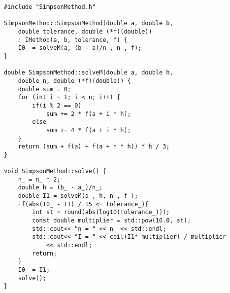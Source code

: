 \begin{lstlisting}
#include "SimpsonMethod.h"

SimpsonMethod::SimpsonMethod(double a, double b,
    double tolerance, double (*f)(double)) 
    : IMethod(a, b, tolerance, f) {
    I0_ = solveM(a, (b - a)/n_, n_, f);
}

double SimpsonMethod::solveM(double a, double h,
    double n, double (*f)(double)) {
    double sum = 0;
    for (int i = 1; i < n; i++) {
        if(i % 2 == 0)
            sum += 2 * f(a + i * h);
        else
            sum += 4 * f(a + i * h);
    }
    return (sum + f(a) + f(a + n * h)) * h / 3;
}

void SimpsonMethod::solve() {
    n_ = n_ * 2;
    double h = (b_ - a_)/n_;
    double I1 = solveM(a_, h, n_, f_);
    if(abs(I0_ - I1) / 15 <= tolerance_){
        int st = round(abs(log10(tolerance_)));
        const double multiplier = std::pow(10.0, st);
        std::cout<< "n = " << n_ << std::endl;
        std::cout<< "I = " << ceil(I1* multiplier) / multiplier
            << std::endl;
        return;
    }
    I0_ = I1;
    solve();
}

\end{lstlisting}